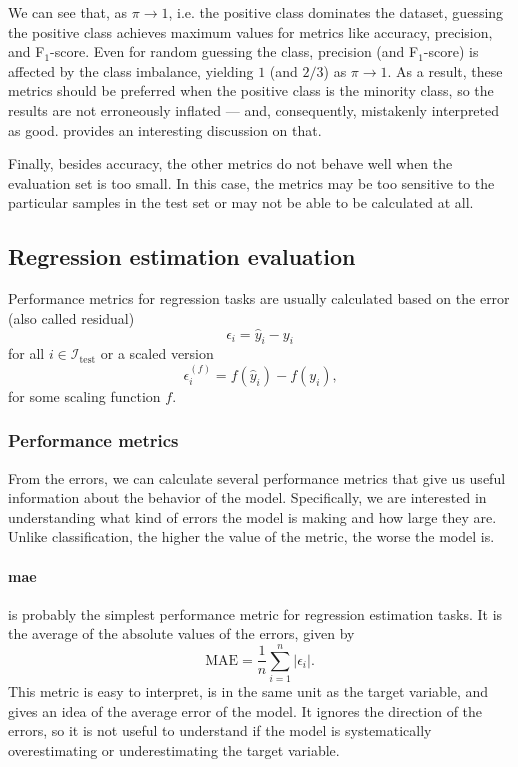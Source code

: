 We can see that, as $\pi \to 1$, i.e. the positive class dominates the dataset, guessing
the positive class achieves maximum values for metrics like accuracy, precision, and
F$_1$-score.  Even for random guessing the class, precision (and F$_1$-score) is affected
by the class imbalance, yielding $1$ (and $2/3$) as $\pi \to 1$.  As a result, these
metrics should be preferred when the positive class is the minority class, so the results
are not erroneously inflated --- and, consequently, mistakenly interpreted as good.
\textcite{Williams2021} provides an interesting discussion on
that.

Finally, besides accuracy, the other metrics do not behave well when the evaluation set is
too small.  In this case, the metrics may be too sensitive to the particular samples in
the test set or may not be able to be calculated at all.

\subsection{Regression estimation evaluation}

Performance metrics for regression tasks are usually calculated based on the error (also
called residual) $$\epsilon_i = \hat{y}_i - y_i$$ for all $i \in \mathcal{I}_\text{test}$ or
a scaled version $$\epsilon_i^{(f)} = f(\hat{y}_i) - f(y_i)\text{,}$$ for some scaling
function $f$.

\subsubsection{Performance metrics}

From the errors, we can calculate several performance metrics that give us useful
information about the behavior of the \gls{model}.  Specifically, we are interested in
understanding what kind of errors the \gls{model} is making and how large they are.  Unlike
classification, the higher the value of the metric, the worse the \gls{model} is.

\paragraph{\Gls{mae}} is probably the simplest performance metric for regression
estimation tasks.  It is the average of the absolute values of the errors,
given by
\begin{equation*}
  \text{MAE} = \frac{1}{n} \sum_{i=1}^n | \epsilon_i |\text{.}
\end{equation*}
This metric is easy to interpret, is in the same unit as the target variable, and gives an
idea of the average error of the \gls{model}.  It ignores the direction of the errors, so it is
not useful to understand if the \gls{model} is systematically overestimating or underestimating
the target variable.

